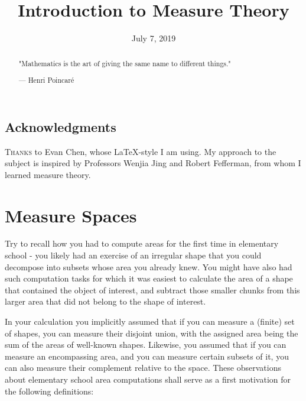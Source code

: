 \documentclass[11pt]{scrartcl}
\begin{document}
\title{Introduction to Measure Theory} %
\date{July 7, 2019}
\maketitle

\begin{abstract}
	\sffamily\small
	"Mathematics is the art of giving the same name to different things."

	\medskip

	--- Henri Poincar\'e
\end{abstract}

\vspace{1em}



\subsection*{Acknowledgments}
\textsc{Thanks} to Evan Chen, whose \LaTeX  -style I am using. My approach to the subject is inspired by Professors Wenjia Jing and Robert Fefferman, from whom I learned measure theory.



\section{Measure Spaces}

Try to recall how you had to compute areas for the first time in elementary school - you likely had an exercise of an irregular shape that you could decompose into subsets whose area you already knew. You might have also had such  computation tasks for which it was easiest to calculate the area of a shape that contained the object of interest, and subtract those smaller chunks from this larger area that did not belong to the shape of interest. 

In your calculation you implicitly assumed that if you can measure a (finite) set of shapes, you can measure their disjoint union, with the assigned area being the sum of the areas of well-known shapes. Likewise, you assumed that if you can measure an encompassing area, and you can measure certain subsets of it, you can also measure their complement relative to the space. These observations about elementary school area computations shall serve as a first motivation for the following definitions: 
\end{document}
